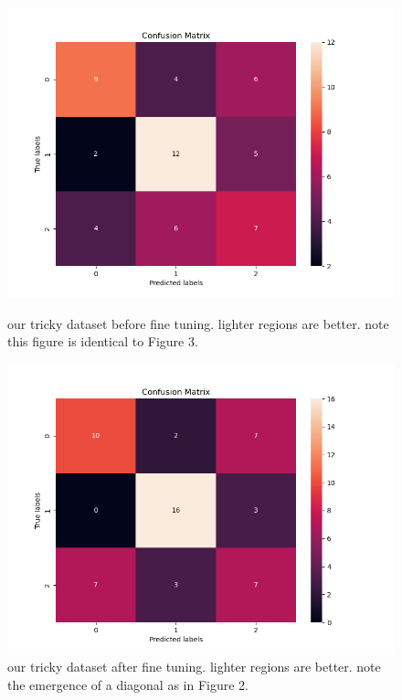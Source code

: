 \documentclass{article}
\begin{document}
\begin{figure}[!h]
	\centering
	\begin{minipage}{0.45\textwidth}
		\includegraphics[width=\linewidth]{figures/tricky_trained_confusion.png}
		\caption{our tricky dataset before fine tuning. lighter regions are better. note this figure is identical to Figure 3.}
	\end{minipage}
	\hfill
	\begin{minipage}{0.45\textwidth}
		\includegraphics[width=\linewidth]{figures/tricky_tuned_confusion.png}
		\caption{our tricky dataset after fine tuning. lighter regions are better. note the emergence of a diagonal as in Figure 2.}
	\end{minipage}
\end{figure}
\end{document}
